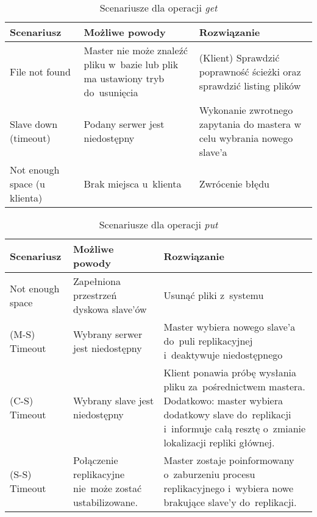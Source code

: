 \begin{table}[h]
\begin{center}
	\begin{tabular}{|p{4cm} | p{4cm} | p{6cm} |}
		\hline
		\textbf{Scenariusz} & \textbf{Możliwe powody} &	\textbf{Rozwiązanie}	\\	\hline
		File not found      & Master nie może znaleźć pliku w~bazie lub plik ma
		ustawiony tryb do~usunięcia &	(Klient) Sprawdzić poprawność ścieżki oraz
		sprawdzić listing plików \\ \hline
		Slave down (timeout) & Podany serwer jest niedostępny & Wykonanie zwrotnego
		zapytania do mastera w celu wybrania nowego slave’a \\ \hline
		Not enough space (u klienta) & Brak miejsca u~klienta & Zwrócenie błędu \\
		\hline
		
	\end{tabular}
\end{center}
\caption{Scenariusze dla operacji \emph{get}}
\end{table}

\begin{table}[h]
\begin{center}
	\begin{tabular}{|p{4cm} | p{4cm} | p{6cm} |}
		\hline
		\textbf{Scenariusz} & \textbf{Możliwe powody} &	\textbf{Rozwiązanie}	\\	\hline
		Not enough space & Zapełniona przestrzeń dyskowa slave’ów & Usunąć pliki
		z~systemu \\ \hline
		(M-S) Timeout & Wybrany serwer jest niedostępny & Master wybiera nowego
		slave’a do~puli replikacyjnej i~deaktywuje niedostępnego \\ \hline
		(C-S) Timeout & Wybrany slave jest niedostępny & Klient ponawia próbę wysłania
		pliku za~pośrednictwem mastera. Dodatkowo: master wybiera dodatkowy slave
		do~replikacji i~informuje całą resztę o~zmianie lokalizacji repliki głównej.
		\\ \hline
		(S-S) Timeout & Połączenie replikacyjne nie~może zostać ustabilizowane. &
		Master zostaje poinformowany o~zaburzeniu procesu replikacyjnego i~wybiera
		nowe brakujące slave’y do~replikacji. \\ \hline
	\end{tabular}
\end{center}
\caption{Scenariusze dla operacji \emph{put}}
\end{table}


